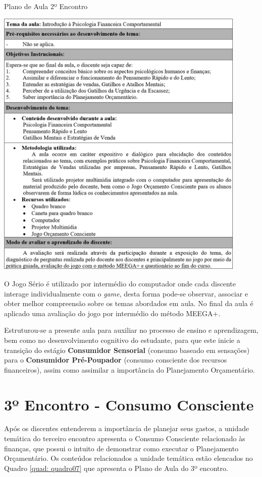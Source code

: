 \graphicspath{{quadros/}} 
\begin{quadro}[!ht]
\centering
\begin{minipage}{1.\textwidth}
\caption{Plano de Aula 2º Encontro}
\centering
\includegraphics[width=0.9\textwidth]{quadro-6_plano-aula-2}
\label{quad: quadro06}
\end{minipage}
\end{quadro}

O Jogo Sério é utilizado por intermédio do computador onde cada discente interage individualmente com o \textit{game}, desta forma pode-se observar, associar e obter melhor compreensão sobre os temas abordados em aula. No final da aula é aplicado uma avaliação do jogo por intermédio do método MEEGA+.

Estruturou-se a presente aula para auxiliar no processo de ensino e aprendizagem, bem como no desenvolvimento cognitivo do estudante, para que este inicie a transição do estágio \textbf{Consumidor Sensorial} (consumo baseado em sensações) para o \textbf{Consumidor Pré-Poupador} (consumo consciente dos recursos financeiros), assim como assimilar a importância do Planejamento Orçamentário.

\section{3º Encontro - Consumo Consciente}
Após os discentes entenderem a importância de planejar seus gastos, a unidade temática do terceiro encontro apresenta o Consumo Consciente relacionado às finanças, que possui o intuito de demonstrar como executar o Planejamento Orçamentário. Os conteúdos relacionados a unidade temática estão elencados no Quadro \ref{quad: quadro07} que apresenta o Plano de Aula do 3º encontro.

